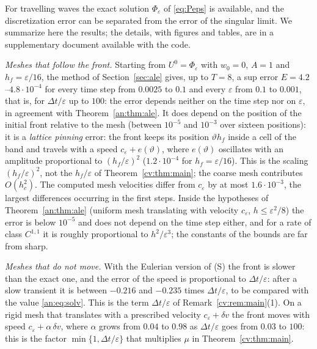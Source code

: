 \documentclass[11pt]{amsart}
\theoremstyle{definition}
\theoremstyle{remark}
\newcommand{\ve}{\varepsilon}
\begin{document}
For travelling waves the exact solution $\Phi_\ve$ of \eqref{eq:Peps} is available, and the
discretization error can be separated from the error of the singular limit. We summarize
here the results; the details, with figures and tables, are in a supplementary
document available with the code.

\emph{Meshes that follow the front.} Starting from $U^0=\Phi_\ve$ with $w_0=0$, $A=1$ and
$h_f=\ve/16$, the method of Section~\ref{sec:ale} gives, up to $T=8$, a sup error
$E=4.2$--$4.8\cdot10^{-4}$ for every time step from $0.0025$ to $0.1$ and every $\ve$ from
$0.1$ to $0.001$, that is, for $\Delta t/\ve$ up to $100$: the error depends neither on the
time step nor on $\ve$, in agreement with Theorem~\ref{an:thm:ale}. It does depend on the
position of the initial front relative to the mesh (between $10^{-5}$ and $10^{-3}$ over
sixteen positions): it is a
\emph{lattice pinning} error: the front keeps its position $\vartheta h_f$ inside a cell of
the band and travels with a speed $c_\ve+e(\vartheta)$, where $e(\vartheta)$ oscillates with an
amplitude proportional to $(h_f/\ve)^2$ ($1.2\cdot10^{-4}$ for $h_f=\ve/16$). This is the
scaling $(h_f/\ve)^2$, not the $h_f/\ve$ of Theorem~\ref{cv:thm:main}; the coarse mesh
contributes $O(h_c^2)$. The computed mesh velocities differ from $c_\ve$ by at most
$1.6\cdot10^{-3}$, the largest differences occurring in the first steps. Inside the hypotheses of Theorem~\ref{an:thm:ale} (uniform mesh
translating with velocity $c_\ve$, $h\le\ve^2/8$) the error is below $10^{-5}$ and does not
depend on the time step either, and for a rate of class $C^{1,1}$ it is roughly
proportional to $h^2/\ve^3$; the constants of the bounds are far from sharp.

\emph{Meshes that do not move.} With the Eulerian version of (S) the front is slower than
the exact one, and the error of the speed is proportional to $\Delta t/\ve$: after a slow
transient it is between $-0.216$ and $-0.235$ times $\Delta t/\ve$, to be compared with the
value \eqref{an:eq:solv}. This is the term $\Delta t/\ve$ of Remark~\ref{cv:rem:main}(1). On a
rigid mesh that translates with a prescribed velocity $c_\ve+\delta v$ the front moves with
speed $c_\ve+\alpha\,\delta v$, where $\alpha$ grows from $0.04$ to $0.98$ as $\Delta t/\ve$ goes from
$0.03$ to $100$: this is the factor $\min\{1,\Delta t/\ve\}$ that multiplies $\mu$ in
Theorem~\ref{cv:thm:main}.
\end{document}
